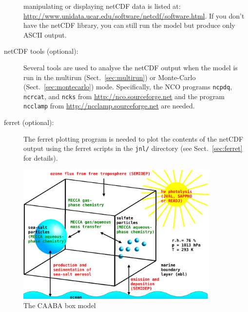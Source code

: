 \documentclass[twoside]{article}
\begin{document}
\begin{description}
  manipulating or displaying netCDF data is listed at:
  \url{http://www.unidata.ucar.edu/software/netcdf/software.html}. If
  you don't have the netCDF library, you can still run the model but
  produce only ASCII output.
\item[netCDF tools (optional):] Several tools are used to analyse the
  netCDF output when the model is run in the multirun
  (Sect.~\ref{sec:multirun}) or Monte-Carlo (Sect.~\ref{sec:montecarlo})
  mode. Specifically, the NCO programs \verb|ncpdq|, \verb|ncrcat|, and
  \verb|ncks| from \url{http://nco.sourceforge.net} and the program
  \verb|ncclamp| from \url{http://ncclamp.sourceforge.net} are needed.
\item[ferret (optional):] The ferret plotting program is needed to plot
  the contents of the netCDF output using the ferret scripts in the
  \verb|jnl/| directory (see Sect.~\ref{sec:ferret} for details).
\end{description}

\begin{figure}%
  \begin{center}
  \includegraphics[width=0.9\textwidth]{caaba_sketch}
  \end{center}
  \caption{The CAABA box model}
  \label{fig:caaba_sketch}
\end{figure}
\end{document}
